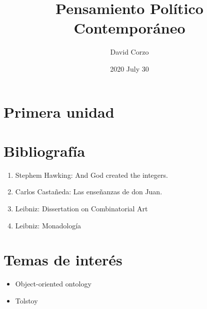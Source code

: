 \documentclass[openany]{book}
\title{Pensamiento Político Contemporáneo}
\date{2020 July 30} %
\author{David Corzo} %
\begin{document}
\maketitle

\chapter{Primera unidad}




\chapter{Bibliografía}
\begin{enumerate}
    \item Stephem Hawking: And God created the integers. 
    \item Carlos Castañeda: Las enseñanzas de don Juan.
    \item Leibniz: Dissertation on Combinatorial Art
    \item Leibniz: Monadología
\end{enumerate}

\chapter{Temas de interés}
\begin{itemize}
    \item Object-oriented ontology
    \item Tolstoy
\end{itemize}

\end{document}
